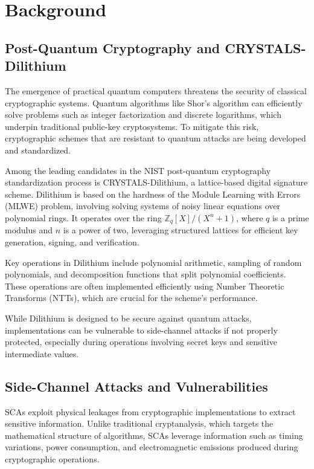 
\chapter{Background}
\thispagestyle{chapterstart}

\section{Post-Quantum Cryptography and CRYSTALS-Dilithium}

The emergence of practical quantum computers threatens the security of classical cryptographic systems. Quantum algorithms like Shor's algorithm can efficiently solve problems such as integer factorization and discrete logarithms, which underpin traditional public-key cryptosystems. To mitigate this risk, cryptographic schemes that are resistant to quantum attacks are being developed and standardized.

Among the leading candidates in the NIST post-quantum cryptography standardization process is CRYSTALS-Dilithium, a lattice-based digital signature scheme. Dilithium is based on the hardness of the Module Learning with Errors (\ac{MLWE}) problem, involving solving systems of noisy linear equations over polynomial rings. It operates over the ring $\mathbb{Z}_q[X]/(X^n + 1)$, where $q$ is a prime modulus and $n$ is a power of two, leveraging structured lattices for efficient key generation, signing, and verification.

Key operations in Dilithium include polynomial arithmetic, sampling of random polynomials, and decomposition functions that split polynomial coefficients. These operations are often implemented efficiently using Number Theoretic Transforms (\acp{NTT}), which are crucial for the scheme's performance.

While Dilithium is designed to be secure against quantum attacks, implementations can be vulnerable to side-channel attacks if not properly protected, especially during operations involving secret keys and sensitive intermediate values.

\section{Side-Channel Attacks and Vulnerabilities}

\acp{SCA} exploit physical leakages from cryptographic implementations to extract sensitive information. Unlike traditional cryptanalysis, which targets the mathematical structure of algorithms, SCAs leverage information such as timing variations, power consumption, and electromagnetic emissions produced during cryptographic operations.

